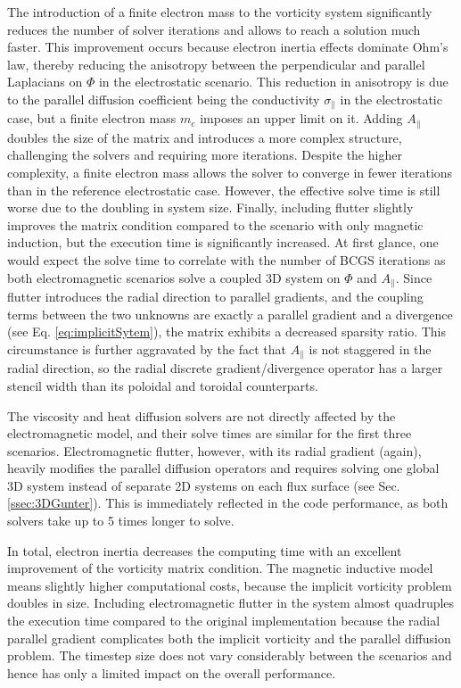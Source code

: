 The introduction of a finite electron mass to the vorticity system significantly reduces the number of solver iterations and allows to reach a solution much faster. This improvement occurs because electron inertia effects dominate Ohm's law, thereby reducing the anisotropy between the perpendicular and parallel Laplacians on $\Phi$ in the electrostatic scenario. This reduction in anisotropy is due to the parallel diffusion coefficient being the conductivity $\sigma_\parallel$ in the electrostatic case, but a finite electron mass $m_e$ imposes an upper limit on it. Adding $A_\parallel$ doubles the size of the matrix and introduces a more complex structure, challenging the solvers and requiring more iterations. Despite the higher complexity, a finite electron mass allows the solver to converge in fewer iterations than in the reference electrostatic case. However, the effective solve time is still worse due to the doubling in system size. Finally, including flutter slightly improves the matrix condition compared to the scenario with only magnetic induction, but the execution time is significantly increased. At first glance, one would expect the solve time to correlate with the number of BCGS iterations as both electromagnetic scenarios solve a coupled 3D system on $\Phi$ and $A_\parallel$. Since flutter introduces the radial direction to parallel gradients, and the coupling terms between the two unknowns are exactly a parallel gradient and a divergence (see Eq. \ref{eq:implicitSytem}), the matrix exhibits a decreased sparsity ratio. This circumstance is further aggravated by the fact that $A_\parallel$ is not staggered in the radial direction, so the radial discrete gradient/divergence operator has a larger stencil width than its poloidal and toroidal counterparts. \newline

The viscosity and heat diffusion solvers are not directly affected by the electromagnetic model, and their solve times are similar for the first three scenarios. Electromagnetic flutter, however, with its radial gradient (again), heavily modifies the parallel diffusion operators and requires solving one global 3D system instead of separate 2D systems on each flux surface (see Sec. \ref{ssec:3DGunter}). This is immediately reflected in the code performance, as both solvers take up to 5 times longer to solve. \newline

In total, electron inertia decreases the computing time with an excellent improvement of the vorticity matrix condition. The magnetic inductive model means slightly higher computational costs, because the implicit vorticity problem doubles in size. Including electromagnetic flutter in the system almost quadruples the execution time compared to the original implementation because the radial parallel gradient complicates both the implicit vorticity and the parallel diffusion problem. The timestep size does not vary considerably between the scenarios and hence has only a limited impact on the overall performance.


